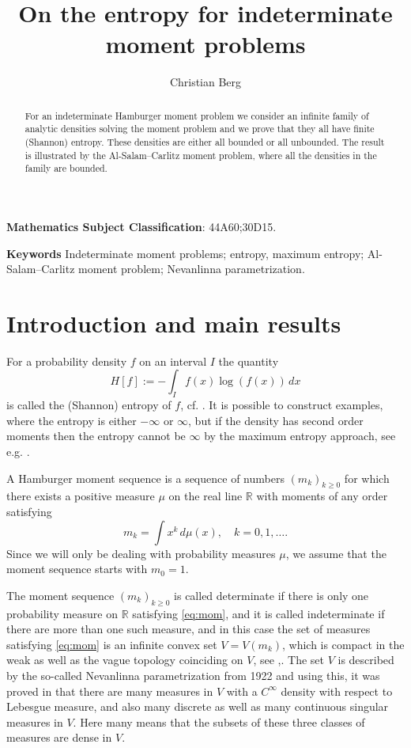 \documentclass [12pt]{article}
\title{On the entropy for indeterminate moment problems}
\author{Christian Berg}
\newcommand{\R}{\mathbb{R}}
\begin{document}
 \maketitle



\begin{abstract}   For an indeterminate Hamburger moment problem we consider  an infinite family of analytic densities solving the moment problem and we  prove that they all have finite (Shannon) entropy. These densities are either all bounded or all unbounded. The result is illustrated by the Al-Salam--Carlitz moment problem, where all the densities in the family are bounded.
\end{abstract}

{\bf Mathematics Subject Classification}:  44A60;30D15.

{\bf Keywords} Indeterminate moment problems; entropy, maximum entropy; Al-Salam--Carlitz moment problem; Nevanlinna parametrization.
  

\section{Introduction and main results} For a probability density $f$ on an interval $I$ the quantity
\begin{equation}\label{eq:ent}
H[f]:=-\int_I f(x)\log(f(x))\,dx 
\end{equation} 
is called the (Shannon) entropy of $f$, cf. \cite{K:K}. It is possible to construct examples,  where the entropy is either $-\infty$ or $\infty$, but if the density has second order moments then the entropy cannot be $\infty$ by the maximum entropy approach, see e.g. \cite[p. 115]{M:T}.

A Hamburger moment sequence is a sequence of numbers $(m_k)_{k\ge 0}$ for which there exists a positive measure $\mu$ on the real line $\R$ with moments of any order satisfying
\begin{equation}\label{eq:mom}
m_k=\int x^k\,d\mu(x),\quad k=0,1,\ldots.
\end{equation}
Since we will only be dealing with probability measures $\mu$, we assume that the moment sequence starts with $m_0=1$.

The moment sequence $(m_k)_{k\ge 0}$ is called determinate if there is only one probability measure on $\R$ satisfying \eqref{eq:mom}, and it is called indeterminate if there are more than one such measure, and in this case the set of measures satisfying \eqref{eq:mom}
 is an infinite convex set $V=V(m_k)$, which is compact in the weak as well as the vague  topology coinciding on $V$, see \cite{Ak},\cite{Sch}. The set $V$ is described by the so-called Nevanlinna parametrization from 1922 and using this, it was proved in \cite{B:C}
that there are many measures in $V$ with a $C^\infty$ density with respect to Lebesgue measure, and also many discrete  as well as many continuous singular measures in $V$. Here many means that the subsets of these three classes of measures are dense in $V$.
\end{document}
